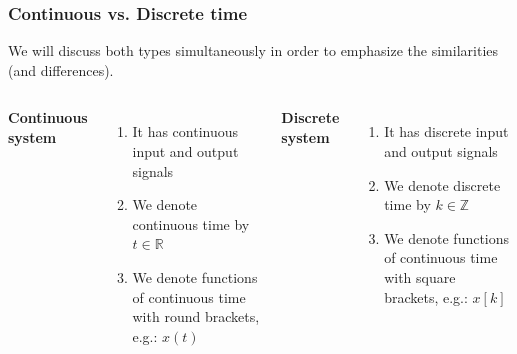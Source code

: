 \documentclass{beamer}
\begin{document}
\begin{frame}
\frametitle{Continuous vs. Discrete time}
\vspace{-4ex}
We will discuss both types simultaneously in order to emphasize the similarities (and differences).\\
\medskip
\begin{columns}[c] 

\center \textbf{Continuous system}
\begin{enumerate}
\item It has continuous input and output signals
\item We denote continuous time by $t \in \mathds{R}$
\item We denote functions of continuous time with round brackets, e.g.: $x(t)$
\end{enumerate}

\center \textbf{Discrete system}
\begin{enumerate}
\item It has discrete input and output signals
\item We denote discrete time by $k \in \mathds{Z}$
\item We denote functions of continuous time with square brackets, e.g.: $x[k]$
\end{enumerate}

\end{columns}
\end{frame}

\end{document}
